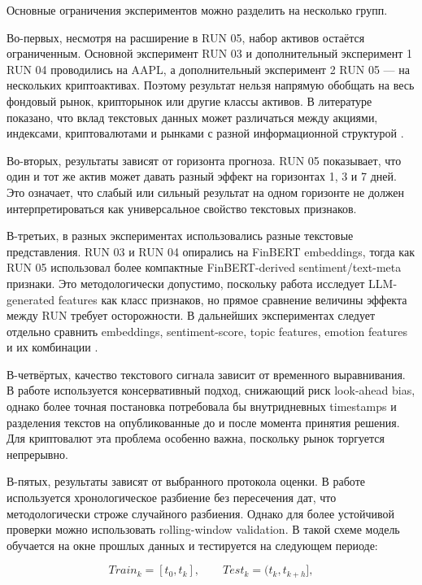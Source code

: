 Основные ограничения экспериментов можно разделить на несколько групп.

Во-первых, несмотря на расширение в RUN 05, набор активов остаётся ограниченным. Основной эксперимент RUN 03 и дополнительный эксперимент 1 RUN 04 проводились на AAPL, а дополнительный эксперимент 2 RUN 05 --- на нескольких криптоактивах. Поэтому результат нельзя напрямую обобщать на весь фондовый рынок, крипторынок или другие классы активов. В литературе показано, что вклад текстовых данных может различаться между акциями, индексами, криптовалютами и рынками с разной информационной структурой \cite{bollen2011twitter,mao2011sentiment,zou2022prebit}.

Во-вторых, результаты зависят от горизонта прогноза. RUN 05 показывает, что один и тот же актив может давать разный эффект на горизонтах 1, 3 и 7 дней. Это означает, что слабый или сильный результат на одном горизонте не должен интерпретироваться как универсальное свойство текстовых признаков.

В-третьих, в разных экспериментах использовались разные текстовые представления. RUN 03 и RUN 04 опирались на FinBERT embeddings, тогда как RUN 05 использовал более компактные FinBERT-derived sentiment/text-meta признаки. Это методологически допустимо, поскольку работа исследует LLM-generated features как класс признаков, но прямое сравнение величины эффекта между RUN требует осторожности. В дальнейших экспериментах следует отдельно сравнить embeddings, sentiment-score, topic features, emotion features и их комбинации \cite{araci2019finbert,yang2020finbert,albada2025bertweet,vuong2025llm}.

В-четвёртых, качество текстового сигнала зависит от временного выравнивания. В работе используется консервативный подход, снижающий риск look-ahead bias, однако более точная постановка потребовала бы внутридневных timestamps и разделения текстов на опубликованные до и после момента принятия решения. Для криптовалют эта проблема особенно важна, поскольку рынок торгуется непрерывно.

В-пятых, результаты зависят от выбранного протокола оценки. В работе используется хронологическое разбиение без пересечения дат, что методологически строже случайного разбиения. Однако для более устойчивой проверки можно использовать rolling-window validation. В такой схеме модель обучается на окне прошлых данных и тестируется на следующем периоде:

\[
Train_k = [t_0, t_k], \qquad Test_k = (t_k, t_{k+h}],
\]

